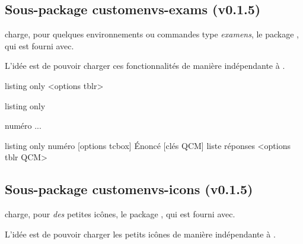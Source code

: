 \documentclass[french,11pt,a4paper]{article}
\begin{document}
\subsection{Sous-package customenvs-exams (v0.1.5)}

 charge, pour quelques environnements ou commandes type \textit{examens}, le package , qui est fourni avec.

L'idée est de pouvoir charger ces fonctionnalités de manière indépendante à .

\begin{DemoCode}{listing only}
%
  <options tblr>
\end{DemoCode}

\begin{DemoCode}{listing only}
\begin{ExamAutomatQuest}{numéro}
...
\end{ExamAutomatQuest}
\end{DemoCode}

\begin{DemoCode}{listing only}
\QuestionAutomatismes%
	{numéro}%
	[options tcbox]%
	{Énoncé}%
	[clés QCM]%
	{liste réponses}%
	<options tblr QCM>%
\end{DemoCode}

\subsection{Sous-package customenvs-icons (v0.1.5)}

 charge, pour \textit{des} petites icônes, le package , qui est fourni avec.

L'idée est de pouvoir charger les petits icônes de manière indépendante à .
\end{document}
